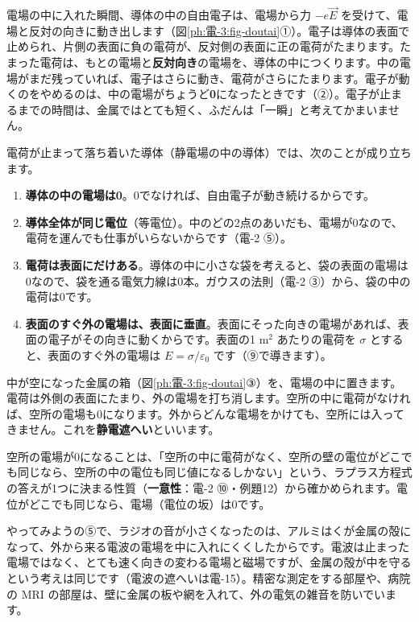 \noindent 電場の中に入れた瞬間、導体の中の自由電子は、電場から力 $-e\vec E$ を受けて、電場と反対の向きに動き出します（図\ref{ph:電-3:fig-doutai}①）。電子は導体の表面で止められ、片側の表面に負の電荷が、反対側の表面に正の電荷がたまります。たまった電荷は、もとの電場と\textbf{反対向き}の電場を、導体の中につくります。中の電場がまだ残っていれば、電子はさらに動き、電荷がさらにたまります。電子が動くのをやめるのは、中の電場がちょうど\textbf{0}になったときです（②）。電子が止まるまでの時間は、金属ではとても短く、ふだんは「一瞬」と考えてかまいません。

\label{ph:電-3:doutai}電荷が止まって落ち着いた導体（静電場の中の導体）では、次のことが成り立ちます。
\begin{enumerate}[label={\bkcircled{\arabic*}}, leftmargin=2.4\zw, itemsep=2pt, topsep=2pt]
\item \textbf{導体の中の電場は0}。0でなければ、自由電子が動き続けるからです。
\item \textbf{導体全体が同じ電位}（等電位）。中のどの2点のあいだも、電場が0なので、電荷を運んでも仕事がいらないからです（電-2 ⑤）。
\item \textbf{電荷は表面にだけある}。導体の中に小さな袋を考えると、袋の表面の電場は0なので、袋を通る電気力線は0本。ガウスの法則（電-2 ③）から、袋の中の電荷は0です。
\item \textbf{表面のすぐ外の電場は、表面に垂直}。表面にそった向きの電場があれば、表面の電子がその向きに動くからです。表面の1 m$^2$ あたりの電荷を $\sigma$ とすると、表面のすぐ外の電場は $E=\sigma/\varepsilon_0$ です（⑨で導きます）。
\end{enumerate}

中が空になった金属の箱（図\ref{ph:電-3:fig-doutai}③）を、電場の中に置きます。電荷は外側の表面にたまり、外の電場を打ち消します。空所の中に電荷がなければ、空所の電場も0になります。外からどんな電場をかけても、空所には入ってきません。これを\textbf{静電遮へい}といいます。

空所の電場が0になることは、「空所の中に電荷がなく、空所の壁の電位がどこでも同じなら、空所の中の電位も同じ値になるしかない」という、ラプラス方程式の答えが1つに決まる性質（\textbf{一意性}：電-2 ⑩・例題12）から確かめられます。電位がどこでも同じなら、電場（電位の坂）は0です。

\begin{phmijika}[ラジオをアルミはくで包む]
やってみようの⑤で、ラジオの音が小さくなったのは、アルミはくが金属の殻になって、外から来る電波の電場を中に入れにくくしたからです。電波は止まった電場ではなく、とても速く向きの変わる電場と磁場ですが、金属の殻が中を守るという考えは同じです（電波の遮へいは電-15）。精密な測定をする部屋や、病院の MRI の部屋は、壁に金属の板や網を入れて、外の電気の雑音を防いでいます。
\end{phmijika}

